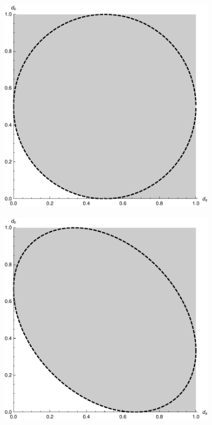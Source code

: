 \begin{figure}
  \centering
  \begin{subfigure}[t]{0.4\textwidth}
    \includegraphics[width=\textwidth]{fourier-ur-2}
  \end{subfigure}\quad
  \begin{subfigure}[t]{0.4\textwidth}
    \includegraphics[width=\textwidth]{fourier-ur-3}

\end{subfigure}
\end{figure}

